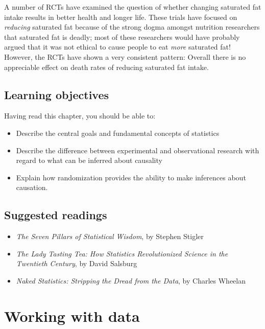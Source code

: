 \documentclass[12pt,]{book}
\providecommand{\tightlist}{%
  \setlength{\itemsep}{0pt}\setlength{\parskip}{0pt}}
\theoremstyle{definition}
\theoremstyle{definition}
\theoremstyle{definition}
\theoremstyle{remark}
\begin{document}
A number of RCTs have examined the question of whether changing saturated fat intake results in better health and longer life. These trials have focused on \emph{reducing} saturated fat because of the strong dogma amongst nutrition researchers that saturated fat is deadly; most of these researchers would have probably argued that it was not ethical to cause people to eat \emph{more} saturated fat! However, the RCTs have shown a very consistent pattern: Overall there is no appreciable effect on death rates of reducing saturated fat intake.

\hypertarget{learning-objectives}{%
\section{Learning objectives}\label{learning-objectives}}

Having read this chapter, you should be able to:

\begin{itemize}
\tightlist
\item
  Describe the central goals and fundamental concepts of statistics
\item
  Describe the difference between experimental and observational research with regard to what can be inferred about causality
\item
  Explain how randomization provides the ability to make inferences about causation.
\end{itemize}

\hypertarget{suggested-readings}{%
\section{Suggested readings}\label{suggested-readings}}

\begin{itemize}
\tightlist
\item
  \emph{The Seven Pillars of Statistical Wisdom}, by Stephen Stigler
\item
  \emph{The Lady Tasting Tea: How Statistics Revolutionized Science in the Twentieth Century}, by David Salsburg
\item
  \emph{Naked Statistics: Stripping the Dread from the Data}, by Charles Wheelan
\end{itemize}

\hypertarget{working-with-data}{%
\chapter{Working with data}\label{working-with-data}}
\end{document}
